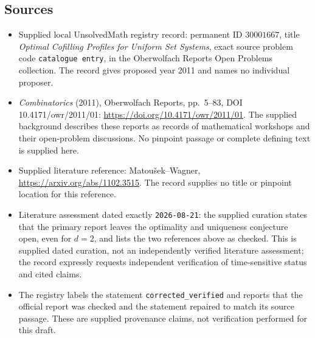 \documentclass[11pt]{article}
\begin{document}
\subsection{Sources}
\begin{itemize}
\item Supplied local UnsolvedMath registry record: permanent ID \(30001667\), title \emph{Optimal Cofilling Profiles for Uniform Set Systems}, exact source problem code \texttt{catalogue entry}, in the Oberwolfach Reports Open Problems collection. The record gives proposed year 2011 and names no individual proposer.
\item \emph{Combinatorics} (2011), Oberwolfach Reports, pp.~5--83, DOI 10.4171/owr/2011/01: \url{https://doi.org/10.4171/owr/2011/01}. The supplied background describes these reports as records of mathematical workshops and their open-problem discussions. No pinpoint passage or complete defining text is supplied here.
\item Supplied literature reference: Matou\v{s}ek--Wagner, \url{https://arxiv.org/abs/1102.3515}. The record supplies no title or pinpoint location for this reference.
\item Literature assessment dated exactly \texttt{2026-08-21}: the supplied curation states that the primary report leaves the optimality and uniqueness conjecture open, even for \(d=2\), and lists the two references above as checked. This is supplied dated curation, not an independently verified literature assessment; the record expressly requests independent verification of time-sensitive status and cited claims.
\item The registry labels the statement \texttt{corrected\_verified} and reports that the official report was checked and the statement repaired to match its source passage. These are supplied provenance claims, not verification performed for this draft.
\end{itemize}
\end{document}
